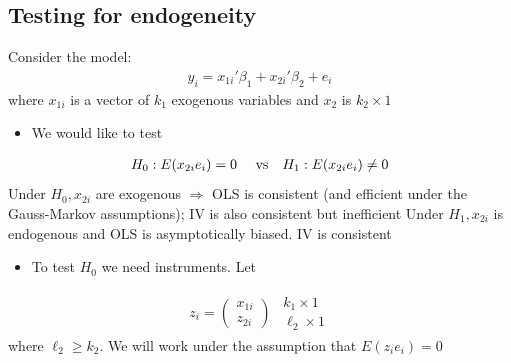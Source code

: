 \documentclass[a4paper,twoside,11pt]{article}
\begin{document}
\subsection{Testing for endogeneity}
Consider the model:
\begin{equation*}
\begin{aligned}
y_i= x_{1i}' \beta_1 + x_{2i}' \beta_2 + e_i
\end{aligned} 
\end{equation*}
where $x_{1i}$ is a vector of $k_1$ exogenous variables and $x_2$ is $k_2 \times 1$
\begin{itemize}
    \item We would like to test
\end{itemize}
\begin{equation*}
\begin{aligned}
H_0:  E(x_{2i} e_i) = 0 \ \ \ \ \textmd{vs} \ \ \ H_1: E(x_{2i} e_i) \ne 0 
\end{aligned} 
\end{equation*}
Under $H_0, x_{2i}$ are exogenous $\Rightarrow$ OLS is consistent (and efficient under the Gauss-Markov assumptions); IV is also consistent but inefficient
\newline
\newline
Under $H_1, x_{2i}$ is endogenous and OLS is asymptotically biased. IV is consistent
\begin{itemize}
    \item To test $H_0$ we need instruments. Let
\end{itemize}
\begin{equation*}
\begin{aligned}
z_i = \begin{pmatrix}
x_{1i}\\
z_{2i}
\end{pmatrix} \ \ \begin{matrix}
k_1 \times 1 \\
\ell_2 \times 1
\end{matrix}
\end{aligned} 
\end{equation*}
where $\ell_2 \ge k_2$. We will work under the assumption that $E(z_i e_i)=0$
\end{document}
